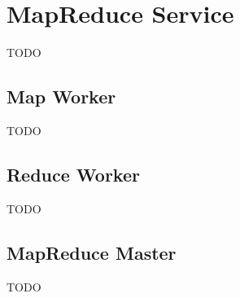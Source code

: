 \section{MapReduce Service}
TODO

\subsection{Map Worker}
TODO








\subsection{Reduce Worker}
TODO

\subsection{MapReduce Master}
TODO